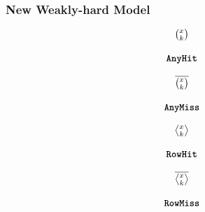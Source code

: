 \begin{frame}
    \frametitle{New Weakly-hard Model}
    \color{black!50!white}
    \begin{minipage}[c]{0.24\textwidth}
        \centering
        \begin{equation*}
            \begin{matrix}
                {\Large \binom{x_{}}{k_{}}}   \\
                            \\
                \texttt{\textbf{AnyHit}}{}
            \end{matrix}
        \end{equation*}
    \end{minipage}\hfill
    \begin{minipage}[c]{0.24\textwidth}
        \centering
        \begin{equation*}
            \begin{matrix}
                {\Large \overline{\binom{x_{}}{k_{}}}}   \\
                            \\
                \texttt{\textbf{AnyMiss}}{}
            \end{matrix}
        \end{equation*}
    \end{minipage}\hfill
    \begin{minipage}[c]{0.24\textwidth}
        \centering
        \begin{equation*}
            \begin{matrix}
                {\Large \rowhit{}}   \\
                            \\
                \tRH{}
            \end{matrix}
        \end{equation*}
    \end{minipage}\hfill
    \begin{minipage}[c]{0.24\textwidth}
        \centering
        \begin{equation*}
            \begin{matrix}
                {\Large \rowmiss{}}   \\
                            \\
                \tRM{}
            \end{matrix}
        \end{equation*}
    \end{minipage}

    \color{black}


\end{frame}

